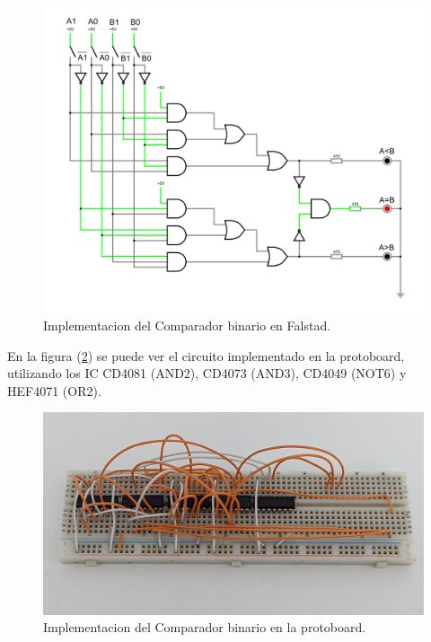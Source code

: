\documentclass[chaptersright]{informeutn}
\begin{document}
    \begin{figure}[!ht]
      \centering
      \includegraphics[width=1\textwidth]{images/ej2.png}
      \caption{Implementacion del Comparador binario en Falstad.}
      \label{falstad.ej2}
    \end{figure}

    En la figura (\ref{crkt.ej2.prot}) se puede ver el circuito implementado en la protoboard, utilizando los IC CD4081
    (AND2), CD4073 (AND3), CD4049 (NOT6) y HEF4071 (OR2).

    \begin{figure}[!ht]
      \centering
      \includegraphics[width=.8\textwidth]{pictures/prot-ej2.jpg}
      \caption{Implementacion del Comparador binario en la protoboard.}
      \label{crkt.ej2.prot}
    \end{figure}
\end{document}
